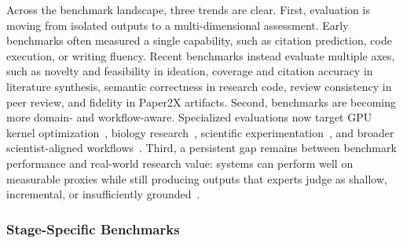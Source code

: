 Across the benchmark landscape, three trends are clear. First, evaluation is moving from isolated outputs to a multi-dimensional assessment. Early benchmarks often measured a single capability, such as citation prediction, code execution, or writing fluency. Recent benchmarks instead evaluate multiple axes, such as novelty and feasibility in ideation, coverage and citation accuracy in literature synthesis, semantic correctness in research code, review consistency in peer review, and fidelity in Paper2X artifacts. Second, benchmarks are becoming more domain- and workflow-aware. Specialized evaluations now target GPU kernel optimization~\cite{kernelbench2025,tritonbench2025}, biology research~\cite{labbench2024}, scientific experimentation~\cite{expbench2025}, and broader scientist-aligned workflows~\cite{astabench2025,researchclawbench2025}. Third, a persistent gap remains between benchmark performance and real-world research value: systems can perform well on measurable proxies while still producing outputs that experts judge as shallow, incremental, or insufficiently grounded~\cite{llmreviewer2025,cycleresearcher2024}.


\subsubsection{Stage-Specific Benchmarks}
\label{sec:bench_overview}

